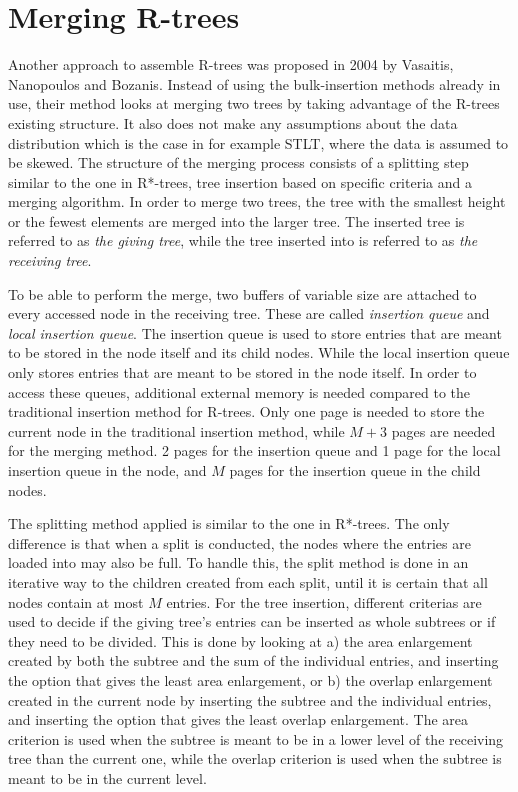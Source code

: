 \section{Merging R-trees}
Another approach to assemble R-trees was proposed in 2004 by Vasaitis, Nanopoulos and Bozanis\cite{MergingRtree}. Instead of using the bulk-insertion methods already in use, their method looks at merging two trees by taking advantage of the R-trees existing structure. It also does not make any assumptions about the data distribution which is the case in for example STLT, where the data is assumed to be skewed\cite{STLT}. The structure of the merging process consists of a splitting step similar to the one in R*-trees, tree insertion based on specific criteria and a merging algorithm. In order to merge two trees, the tree with the smallest height or the fewest elements are merged into the larger tree. The inserted tree is referred to as \emph{the giving tree}, while the tree inserted into is referred to as \emph{the receiving tree}. \newline

\noindent
To be able to perform the merge, two buffers of variable size are attached to every accessed node in the receiving tree. These are called \emph{insertion queue} and \emph{local insertion queue}. The insertion queue is used to store entries that are meant to be stored in the node itself and its child nodes. While the local insertion queue only stores entries that are meant to be stored in the node itself. In order to access these queues, additional external memory is needed compared to the traditional insertion method for R-trees. Only one page is needed to store the current node in the traditional insertion method, while $M+3$ pages are needed for the merging method. 2 pages for the insertion queue and 1 page for the local insertion queue in the node, and $M$ pages for the insertion queue in the child nodes.\newline

\noindent
The splitting method applied is similar to the one in R*-trees. The only difference is that when a split is conducted, the nodes where the entries are loaded into may also be full. To handle this, the split method is done in an iterative way to the children created from each split, until it is certain that all nodes contain at most $M$ entries. For the tree insertion, different criterias are used to decide if the giving tree's entries can be inserted as whole subtrees or if they need to be divided. This is done by looking at a) the area enlargement created by both the subtree and the sum of the individual entries, and inserting the option that gives the least area enlargement, or b) the overlap enlargement created in the current node by inserting the subtree and the individual entries, and inserting the option that gives the least overlap enlargement. The area criterion is used when the subtree is meant to be in a lower level of the receiving tree than the current one, while the overlap criterion is used when the subtree is meant to be in the current level.\newline

